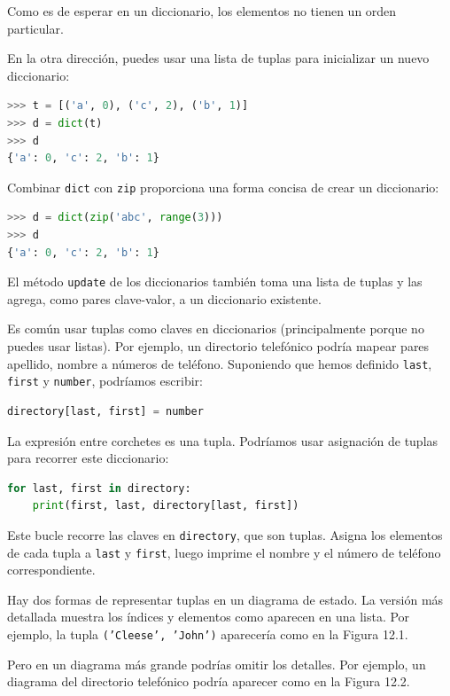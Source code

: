 Como es de esperar en un diccionario, los elementos no tienen un orden particular.

En la otra dirección, puedes usar una lista de tuplas para inicializar un nuevo diccionario:

\begin{lstlisting}[language=Python]
>>> t = [('a', 0), ('c', 2), ('b', 1)]
>>> d = dict(t)
>>> d
{'a': 0, 'c': 2, 'b': 1}
\end{lstlisting}

Combinar \texttt{dict} con \texttt{zip} proporciona una forma concisa de crear un diccionario:

\begin{lstlisting}[language=Python]
>>> d = dict(zip('abc', range(3)))
>>> d
{'a': 0, 'c': 2, 'b': 1}
\end{lstlisting}

El método \texttt{update} de los diccionarios también toma una lista de tuplas y las agrega, como pares clave-valor, a un diccionario existente.

Es común usar tuplas como claves en diccionarios (principalmente porque no puedes usar listas). Por ejemplo, un directorio telefónico podría mapear pares apellido, nombre a números de teléfono. Suponiendo que hemos definido \texttt{last}, \texttt{first} y \texttt{number}, podríamos escribir:

\begin{lstlisting}[language=Python]
directory[last, first] = number
\end{lstlisting}

La expresión entre corchetes es una tupla. Podríamos usar asignación de tuplas para recorrer este diccionario:

\begin{lstlisting}[language=Python]
for last, first in directory:
    print(first, last, directory[last, first])
\end{lstlisting}

Este bucle recorre las claves en \texttt{directory}, que son tuplas. Asigna los elementos de cada tupla a \texttt{last} y \texttt{first}, luego imprime el nombre y el número de teléfono correspondiente.

Hay dos formas de representar tuplas en un diagrama de estado. La versión más detallada muestra los índices y elementos como aparecen en una lista. Por ejemplo, la tupla \texttt{('Cleese', 'John')} aparecería como en la Figura 12.1.

Pero en un diagrama más grande podrías omitir los detalles. Por ejemplo, un diagrama del directorio telefónico podría aparecer como en la Figura 12.2.


